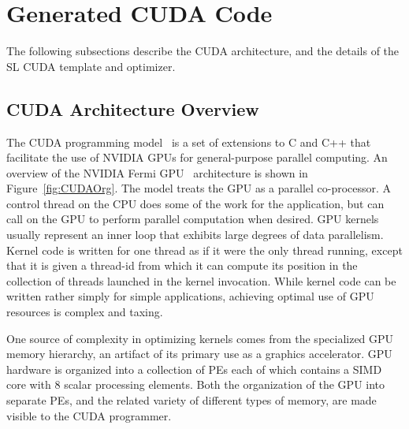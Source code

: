 \documentclass{sig-alternate}
\begin{document}
\section{Generated CUDA Code}

The following subsections describe the CUDA architecture, and the details of
the SL CUDA template and optimizer.

\subsection{CUDA Architecture Overview}

The CUDA programming model~\cite{CUDA1, CUDA2} is a set of extensions to C
and C++ that facilitate the use of NVIDIA GPUs for general-purpose parallel
computing.  An overview of the NVIDIA Fermi GPU~\cite{Fermi} architecture is
shown in Figure~\ref{fig:CUDAOrg}.  The model treats the GPU as a parallel
co-processor.  A control thread on the CPU does some of the work for the
application, but can call on the GPU to perform parallel computation when
desired.  GPU kernels usually represent an inner loop that exhibits large
degrees of data parallelism.  Kernel code is written for one thread as if it
were the only thread running, except that it is given a thread-id from which
it can compute its position in the collection of threads launched in the
kernel invocation.  While kernel code can be written rather simply for simple
applications, achieving optimal use of GPU resources is complex and taxing.

One source of complexity in optimizing kernels comes from the specialized GPU
memory hierarchy, an artifact of its primary use as a graphics accelerator.
GPU hardware is organized into a collection of PEs each of which contains a
SIMD core with 8 scalar processing elements.  Both the organization of the
GPU into separate PEs, and the related variety of different types of memory,
are made visible to the CUDA programmer.
\end{document}
